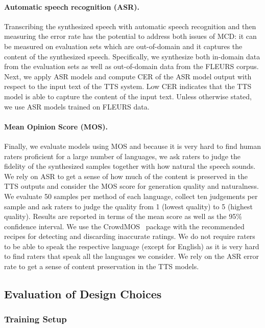\paragraph{Automatic speech recognition (ASR).}
Transcribing the synthesized speech with automatic speech recognition and then measuring the error rate has the potential to address both issues of MCD: it can be measured on evaluation sets which are out-of-domain and it captures the content of the synthesized speech.
Specifically, we synthesize both in-domain data from the \MMS{} evaluation sets as well as out-of-domain data from the FLEURS corpus. 
Next, we apply ASR models and compute CER of the ASR model output with respect to the input text of the TTS system.
Low CER indicates that the TTS model is able to capture the content of the input text.
Unless otherwise stated, we use ASR models trained on FLEURS data.

\paragraph{Mean Opinion Score (MOS).}
Finally, we evaluate models using MOS and because it is very hard to find human raters proficient for a large number of languages, we ask raters to judge the fidelity of the synthesized samples together with how natural the speech sounds.
We rely on ASR to get a sense of how much of the content is preserved in the TTS outputs and consider the MOS score for generation quality and naturalness.
We evaluate 50 samples per method of each language, collect ten judgements per sample and ask raters to judge the quality from 1 (lowest quality) to 5 (highest quality). 
Results are reported in terms of the mean score as well as the 95\% confidence interval.
We use the CrowdMOS~\citep{ribeiro2011crowdmos} package with the recommended recipes for detecting and discarding inaccurate ratings.
We do not require raters to be able to speak the respective language (except for English) as it is very hard to find raters that speak all the languages we consider. 
We rely on the ASR error rate to get a sense of content preservation in the TTS models.


\subsection{Evaluation of Design Choices}
\label{sec:tts-results-english}

\subsubsection{Training Setup}

